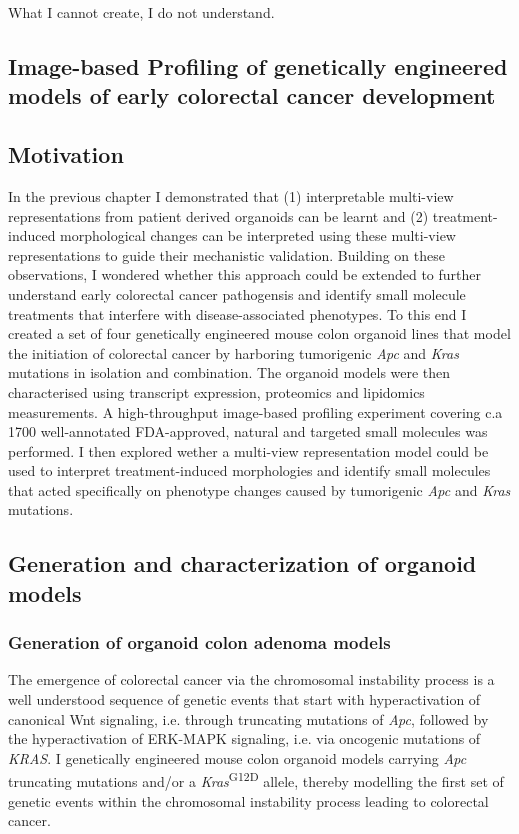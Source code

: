\begin{savequote}[75mm]
What I cannot create, I do not understand.
\end{savequote}

\begin{flushleft}
\chapter{Image-based Profiling of genetically engineered models of early colorectal cancer development}

\section{Motivation}

In the previous chapter I demonstrated that (1) interpretable multi-view representations from patient derived organoids can be learnt and (2) treatment-induced morphological changes can be interpreted using these multi-view representations to guide their mechanistic validation. Building on these observations, I wondered whether this approach could be extended to further understand early colorectal cancer pathogensis and identify small molecule treatments that interfere with disease-associated phenotypes. To this end I created a set of four genetically engineered mouse colon organoid lines that model the initiation of colorectal cancer by harboring tumorigenic \textit{Apc} and \textit{Kras} mutations in isolation and combination. The organoid models were then characterised using transcript expression, proteomics and lipidomics measurements. A high-throughput image-based profiling experiment covering c.a 1700 well-annotated FDA-approved, natural and targeted small molecules was performed. I then explored wether a multi-view representation model could be used to interpret treatment-induced morphologies and identify small molecules that acted specifically on phenotype changes caused by tumorigenic \textit{Apc} and \textit{Kras} mutations. 

\section{Generation and characterization of organoid models}
\subsection{Generation of organoid colon adenoma models}
The emergence of colorectal cancer via the chromosomal instability process is a well understood sequence of genetic events that start with hyperactivation of canonical Wnt signaling, i.e. through truncating mutations of \textit{Apc}, followed by the hyperactivation of ERK-MAPK signaling, i.e. via oncogenic mutations of \textit{KRAS}. I genetically engineered mouse colon organoid models carrying \textit{Apc} truncating mutations and/or a \textit{Kras}\textsuperscript{G12D} allele, thereby modelling the first set of genetic events within the chromosomal instability process leading to colorectal cancer. 


\end{flushleft}
